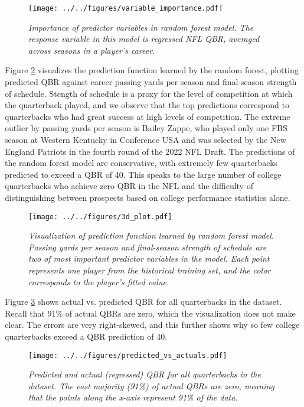 \documentclass{article}
\begin{document}
\begin{figure}
    \centering
    \texttt{[image: ../../figures/variable\_importance.pdf]}
    \caption{\it Importance of predictor variables in random forest model. The response variable in this model is regressed NFL QBR, averaged across seasons in a player's career.}
    \label{fig:importance}
\end{figure}

Figure \ref{fig:3d-plot} visualizes the prediction function learned by the random forest, plotting predicted QBR against career passing yards per season and final-season strength of schedule. Stength of schedule is a proxy for the level of competition at which the quarterback played, and we observe that the top predictions correspond to quarterbacks who had great success at high levels of competition. The extreme outlier by passing yards per season is Bailey Zappe, who played only one FBS season at Western Kentucky in Conference USA and was selected by the New England Patriots in the fourth round of the 2022 NFL Draft. The predictions of the random forest model are conservative, with extremely few quarterbacks predicted to exceed a QBR of 40. This speaks to the large number of college quarterbacks who achieve zero QBR in the NFL and the difficulty of distinguishing between prospects based on college performance statistics alone.

\begin{figure}
    \centering
    \texttt{[image: ../../figures/3d\_plot.pdf]}
    \caption{\it Visualization of prediction function learned by random forest model. Passing yards per season and final-season strength of schedule are two of most important predictor variables in the model. Each point represents one player from the historical training set, and the color corresponds to the player's fitted value.}
    \label{fig:3d-plot}
\end{figure}

Figure \ref{fig:predicted-vs-actuals} shows actual vs. predicted QBR for all quarterbacks in the dataset. Recall that 91\% of actual QBRs are zero, which the visualization does not make clear. The errors are very right-skewed, and this further shows why so few college quarterbacks exceed a QBR prediction of 40.

\begin{figure}[H]
  \centering
  \texttt{[image: ../../figures/predicted\_vs\_actuals.pdf]}
  \caption{\it Predicted and actual (regressed) QBR for all quarterbacks in the dataset. The vast majority (91\%) of actual QBRs are zero, meaning that the points along the x-axis represent 91\% of the data.}
  \label{fig:predicted-vs-actuals}
\end{figure}
\end{document}
